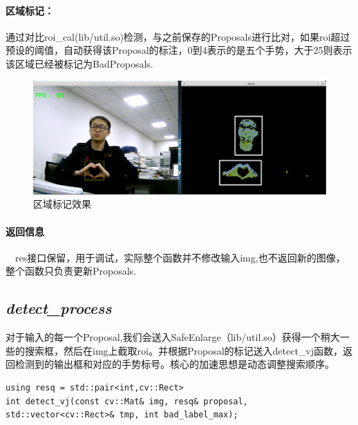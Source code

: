\documentclass{article}
\begin{document}
\paragraph{{\large 区域标记：}}通过对比roi\_cal(lib/util.so)检测，与之前保存的Proposals进行比对，如果roi超过预设的阈值，自动获得该Proposal的标注，0到4表示的是五个手势，大于25则表示该区域已经被标记为BadProposals.
	\begin{figure}[htb]
	\centering
	\centerline{\includegraphics[width = 01.0\textwidth]{pic/faceandhand.png}}
	\caption{区域标记效果}
	\label{fig:label}
	\end{figure}
\paragraph{{\large 返回信息}}　res接口保留，用于调试，实际整个函数并不修改输入img,也不返回新的图像，整个函数只负责更新Proposals.

	\subsection{\emph{detect\_process}}对于输入的每一个Proposal,我们会送入SafeEnlarge（lib/util.so）获得一个稍大一些的搜索框，然后在img上截取roi。并根据Proposal的标记送入detect\_vj函数，返回检测到的输出框和对应的手势标号。核心的加速思想是动态调整搜索顺序。

\lstset{language=C++}
\begin{lstlisting}
using resq = std::pair<int,cv::Rect>
int detect_vj(const cv::Mat& img, resq& proposal, 
std::vector<cv::Rect>& tmp, int bad_label_max);
\end{lstlisting}
\end{document}
